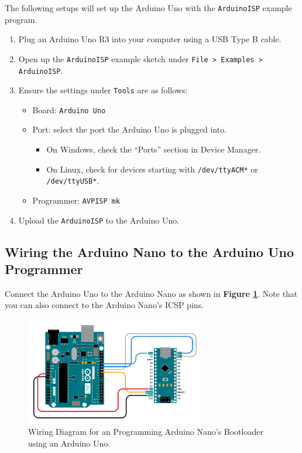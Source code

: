 \documentclass{article}
\begin{document}
The following setups will set up the Arduino Uno with the \verb|ArduinoISP| example program.

\begin{enumerate}
    \item Plug an Arduino Uno R3 into your computer using a USB Type B cable.
    \item Open up the \verb|ArduinoISP| example sketch under \verb|File > Examples > ArduinoISP|.
    \item Ensure the settings under \verb|Tools| are as follows:
    \begin{itemize}
        \item Board: \verb|Arduino Uno|
        \item Port: select the port the Arduino Uno is plugged into. 
        \begin{itemize}
            \item On Windows, check the “Ports” section in Device Manager.
            \item On Linux, check for devices starting with \verb|/dev/ttyACM*| or \verb|/dev/ttyUSB*|.
        \end{itemize}
        \item Programmer: \verb|AVPISP mk|
    \end{itemize}
    \item Upload the \verb|ArduinoISP| to the Arduino Uno.
\end{enumerate}

\subsection{Wiring the Arduino Nano to the Arduino Uno Programmer}

Connect the Arduino Uno to the Arduino Nano as shown in {\bf Figure \ref{fig:wiring-diagram}}. Note that you can also connect to the Arduino Nano's ICSP pins.

\begin{figure}[ht]
    \centering
    \includegraphics[width = 0.7\textwidth]{images/Uno_to_Nano_burn_bootloader.png}
    \cprotect\caption{Wiring Diagram for an Programming Arduino Nano's Bootloader using an Arduino Uno.}
    \label{fig:wiring-diagram}
\end{figure}
\end{document}
